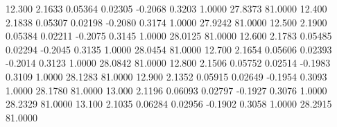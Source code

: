   12.300   2.1633   0.05364   0.02305  -0.2068   0.3203   1.0000  27.8373  81.0000
  12.400   2.1838   0.05307   0.02198  -0.2080   0.3174   1.0000  27.9242  81.0000
  12.500   2.1900   0.05384   0.02211  -0.2075   0.3145   1.0000  28.0125  81.0000
  12.600   2.1783   0.05485   0.02294  -0.2045   0.3135   1.0000  28.0454  81.0000
  12.700   2.1654   0.05606   0.02393  -0.2014   0.3123   1.0000  28.0842  81.0000
  12.800   2.1506   0.05752   0.02514  -0.1983   0.3109   1.0000  28.1283  81.0000
  12.900   2.1352   0.05915   0.02649  -0.1954   0.3093   1.0000  28.1780  81.0000
  13.000   2.1196   0.06093   0.02797  -0.1927   0.3076   1.0000  28.2329  81.0000
  13.100   2.1035   0.06284   0.02956  -0.1902   0.3058   1.0000  28.2915  81.0000
